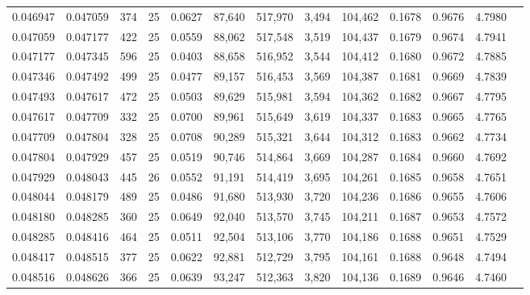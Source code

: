 \begin{tabular}{rrrrrrrrrrrrr}
0.046947 & 0.047059 &   374 &  25 &                                     0.0627 &  87,640 & 517,970 &   3,494 & 104,462 & 0.1678 & 0.9676 & 4.7980 \\
0.047059 & 0.047177 &   422 &  25 &                                     0.0559 &  88,062 & 517,548 &   3,519 & 104,437 & 0.1679 & 0.9674 & 4.7941 \\
0.047177 & 0.047345 &   596 &  25 &                                     0.0403 &  88,658 & 516,952 &   3,544 & 104,412 & 0.1680 & 0.9672 & 4.7885 \\
0.047346 & 0.047492 &   499 &  25 &                                     0.0477 &  89,157 & 516,453 &   3,569 & 104,387 & 0.1681 & 0.9669 & 4.7839 \\
0.047493 & 0.047617 &   472 &  25 &                                     0.0503 &  89,629 & 515,981 &   3,594 & 104,362 & 0.1682 & 0.9667 & 4.7795 \\
0.047617 & 0.047709 &   332 &  25 &                                     0.0700 &  89,961 & 515,649 &   3,619 & 104,337 & 0.1683 & 0.9665 & 4.7765 \\
0.047709 & 0.047804 &   328 &  25 &                                     0.0708 &  90,289 & 515,321 &   3,644 & 104,312 & 0.1683 & 0.9662 & 4.7734 \\
0.047804 & 0.047929 &   457 &  25 &                                     0.0519 &  90,746 & 514,864 &   3,669 & 104,287 & 0.1684 & 0.9660 & 4.7692 \\
0.047929 & 0.048043 &   445 &  26 &                                     0.0552 &  91,191 & 514,419 &   3,695 & 104,261 & 0.1685 & 0.9658 & 4.7651 \\
0.048044 & 0.048179 &   489 &  25 &                                     0.0486 &  91,680 & 513,930 &   3,720 & 104,236 & 0.1686 & 0.9655 & 4.7606 \\
0.048180 & 0.048285 &   360 &  25 &                                     0.0649 &  92,040 & 513,570 &   3,745 & 104,211 & 0.1687 & 0.9653 & 4.7572 \\
0.048285 & 0.048416 &   464 &  25 &                                     0.0511 &  92,504 & 513,106 &   3,770 & 104,186 & 0.1688 & 0.9651 & 4.7529 \\
0.048417 & 0.048515 &   377 &  25 &                                     0.0622 &  92,881 & 512,729 &   3,795 & 104,161 & 0.1688 & 0.9648 & 4.7494 \\
0.048516 & 0.048626 &   366 &  25 &                                     0.0639 &  93,247 & 512,363 &   3,820 & 104,136 & 0.1689 & 0.9646 & 4.7460 \\

\end{tabular}
